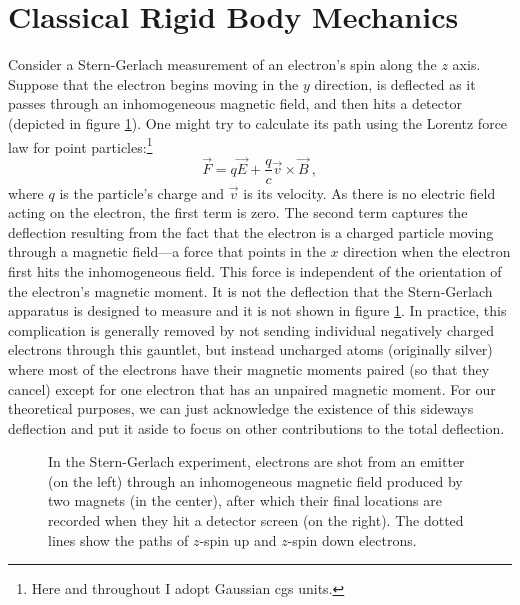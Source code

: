 \documentclass[onecolumn,secnumarabic,amsmath,amssymb,balancelastpage,nofootinbib]{article}
\begin{document}
\section{Classical Rigid Body Mechanics}\label{rigidbodysection}

Consider a Stern-Gerlach measurement of an electron's spin along the $z$ axis.  Suppose that the electron begins moving in the $y$ direction, is deflected as it passes through an inhomogeneous magnetic field, and then hits a detector (depicted in figure \ref{SGsetup}).  One might try to calculate its path using the Lorentz force law for point particles:\footnote{Here and throughout I adopt Gaussian cgs units.}
\begin{equation}
\vec{F}= q  \vec{E} + \frac{q}{c} \vec{v} \times \vec{B}
\ ,
\label{pforcelaw}
\end{equation}
where $q$ is the particle's charge and $\vec{v}$ is its velocity.  As there is no electric field acting on the electron, the first term is zero.  The second term captures the deflection resulting from the fact that the electron is a charged particle moving through a magnetic field---a force that points in the $x$ direction when the electron first hits the inhomogeneous field.  This force is independent of the orientation of the electron's magnetic moment.  It is not the deflection that the Stern-Gerlach apparatus is designed to measure and it is not shown in figure \ref{SGsetup}.  In practice, this complication is generally removed by not sending individual negatively charged electrons through this gauntlet, but instead uncharged atoms (originally silver) where most of the electrons have their magnetic moments paired (so that they cancel) except for one electron that has an unpaired magnetic moment.  For our theoretical purposes, we can just acknowledge the existence of this sideways deflection and put it aside to focus on other contributions to the total deflection.

\begin{figure}[p!]
\caption{In the Stern-Gerlach experiment, electrons are shot from an emitter (on the left) through an inhomogeneous magnetic field produced by two magnets (in the center), after which their final locations are recorded when they hit a detector screen (on the right).  The dotted lines show the paths of $z$-spin up and $z$-spin down electrons.}
  \label{SGsetup}
\end{figure}
\end{document}
